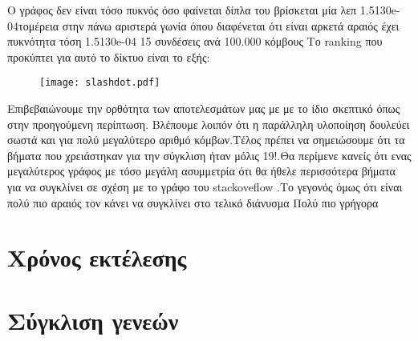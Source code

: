  Ο γράφος δεν είναι τόσο πυκνός όσο φαίνεται δίπλα του βρίσκεται μία λεπ 1.5130e-04τομέρεια στην πάνω αριστερά γωνία όπου διαφένεται ότι είναι 
 αρκετά αραιός έχει πυκνότητα τόση 1.5130e-04 15 συνδέσεις ανά  100.000 κόμβους 
\newpage 
Το ranking που προκύπτει για αυτό το δίκτυο είναι το εξής:
   \begin{figure}[h!]
\centerline{ \texttt{[image: slashdot.pdf]}}
\end{figure}
 Επιβεβαιώνουμε την ορθότητα των αποτελεσμάτων μας με με το ίδιο σκεπτικό όπως στην προηγούμενη περίπτωση.
 Βλέπουμε λοιπόν ότι η παράλληλη υλοποίηση δουλεύει σωστά και για πολύ μεγαλύτερο αριθμό κόμβων.Τέλος 
 πρέπει να σημειώσουμε   ότι τα βήματα που χρειάστηκαν για την σύγκλιση ήταν μόλις 19!.Θα περίμενε κανείς ότι ενας
 μεγαλύτερος γράφος με τόσο μεγάλη ασυμμετρία ότι θα ήθελε περισσότερα βήματα για να συγκλίνει σε σχέση με το γράφο του stackoveflow .Το γεγονός όμως ότι είναι πολύ πιο αραιός τον κάνει να συγκλίνει στο τελικό διάνυσμα Πολύ πιο γρήγορα
 
 
 
\section{Χρόνος εκτέλεσης}
\section{Σύγκλιση γενεών}
